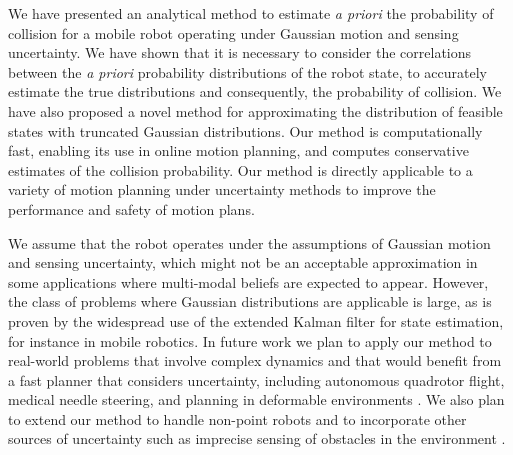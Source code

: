 We have presented an analytical method to estimate \emph{a priori} the probability of collision for a mobile robot operating under Gaussian motion and sensing uncertainty. We have shown that it is necessary to consider the correlations between the \emph{a priori} probability distributions of the robot state, to accurately estimate the true distributions and consequently, the probability of collision. We have also proposed a novel method for approximating the distribution of feasible states with truncated Gaussian distributions. Our method is computationally fast, enabling its use in online motion planning, and computes conservative estimates of the collision probability. Our method is directly applicable to a variety of motion planning under uncertainty methods \cite{vandenBerg11_IJRR, Vitus11_ICRA, Bry11_ICRA, Erez10_UAI, Toussaint09_ICML} to improve the performance and safety of motion plans.

We assume that the robot operates under the assumptions of Gaussian motion and sensing uncertainty, which might not be an acceptable approximation in some applications where multi-modal beliefs are expected to appear. However, the class of problems where Gaussian distributions are applicable is large, as is proven by the widespread use of the extended Kalman filter for state estimation, for instance in
mobile robotics. In future work we plan to apply our method to real-world problems that involve complex dynamics and that would benefit from a fast planner that considers uncertainty, including autonomous quadrotor flight, medical needle steering, and planning in deformable environments \cite{Patil11_RSS}. We also plan to extend our method to handle non-point robots and to incorporate other sources of uncertainty such as imprecise sensing of obstacles in the environment \cite{Guibas08_WAFR}. %